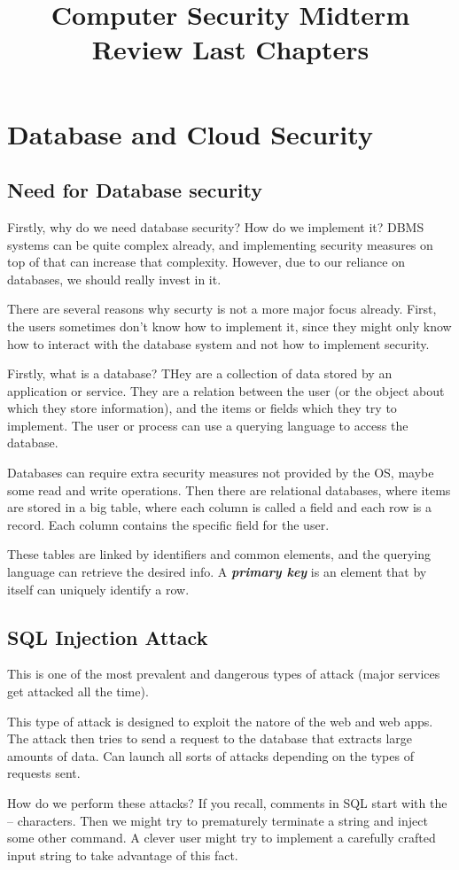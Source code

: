\documentclass{article}
\title{Computer Security Midterm Review Last Chapters}
\begin{document}
\section{Database and Cloud Security}
\subsection{Need for Database security}
Firstly, why do we need database security? How do we implement it? DBMS systems can be quite complex already, 
and implementing security measures on top of that can increase that complexity. However, due to our reliance 
on databases, we should really invest in it.

There are several reasons why securty is not a more major focus already. First, the users sometimes don't know
how to implement it, since they might only know how to interact with the database system and not how to 
implement security.

Firstly, what is a database? THey are a collection of data stored by an application or service.  They are a relation
between the user (or the object about which they store information), and the items or fields which they try to
implement. The user or process can use a querying language to access the database.

Databases can require extra security measures not provided by the OS, maybe some read and write operations. Then there
are relational databases, where items are stored in a big table, where each column is called a field and each row is
a record. Each column contains the specific field for the user.

These tables are linked by identifiers and common elements, and the querying language can retrieve the desired info.
A \textit{\textbf{primary key}} is an element that by itself can uniquely identify a row.
\subsection{SQL Injection Attack}
This is one of the most prevalent and dangerous types of attack (major services get attacked all the time).
 
 This type of attack is designed to exploit the natore of  the web and web apps. The attack then tries to send 
 a request to the database that extracts large amounts of data. Can launch all sorts of attacks depending on the
 types of requests sent.

 How do we perform these attacks? If you recall, comments in SQL start with the -- characters. Then we might try to
 prematurely terminate a string and inject some other command. A clever user might try to implement a carefully crafted
 input string to take advantage of this fact.
 
\end{document}
